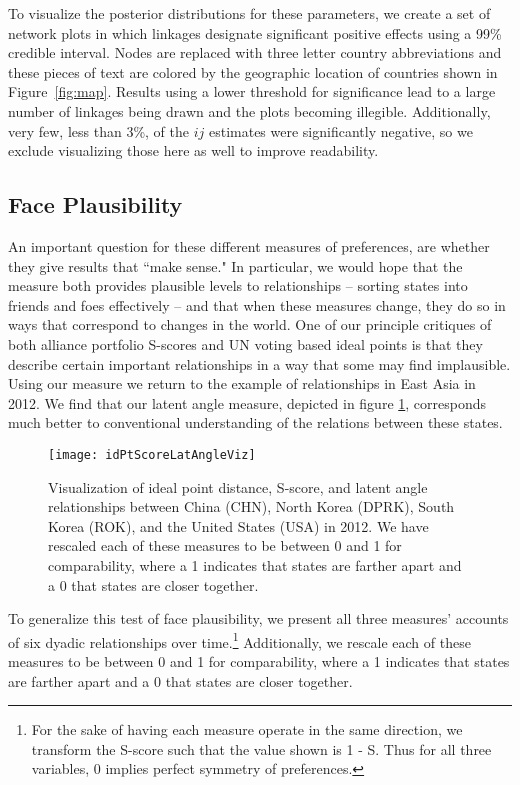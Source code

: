 To visualize the posterior distributions for these parameters, we create a set of network plots in which linkages designate significant positive effects using a 99\% credible interval. Nodes are replaced with three letter country abbreviations and these pieces of text are colored by the geographic location of countries shown in Figure~\ref{fig:map}. Results using a lower threshold for significance lead to a large number of linkages being drawn and the plots becoming illegible. Additionally, very few, less than 3\%, of the $ij$ estimates were significantly negative, so we exclude visualizing those here as well to improve readability. 

\subsection*{Face Plausibility}

An important question for these different measures of preferences, are whether they give results that ``make sense." In particular, we would hope that the measure both provides plausible levels to relationships -- sorting states into friends and foes effectively -- and that when these measures change, they do so in ways that correspond to changes in the world. One of our principle critiques of both alliance portfolio S-scores and UN voting based ideal points is that they describe certain important relationships in a way that some may find implausible. Using our measure we return to the example of relationships in East Asia in 2012. We find that our latent angle measure, depicted in figure \ref{korea:withus}, corresponds much better to conventional understanding of the relations between these states.

\begin{figure}[ht]
\texttt{[image: idPtScoreLatAngleViz]}
\caption{Visualization of ideal point distance, S-score, and latent angle relationships between China (CHN), North Korea (DPRK), South Korea (ROK), and the United States (USA) in 2012. We have rescaled each of these measures to be between 0 and 1 for comparability, where a 1 indicates that states are farther apart and a 0 that states are closer together.}
\label{korea:withus}
\end{figure}

To generalize this test of face plausibility, we present all three measures' accounts of six dyadic relationships over time.\footnote{For the sake of having each measure operate in the same direction, we transform the S-score such that the value shown is 1 - S. Thus for all three variables, $0$ implies perfect symmetry of preferences.} Additionally, we rescale each of these measures to be between 0 and 1 for comparability, where a 1 indicates that states are farther apart and a 0 that states are closer together.

